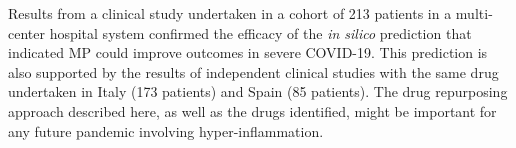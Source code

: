 
Results from a clinical study undertaken in a cohort of 213 patients in a multi-center hospital system confirmed the efficacy of the \emph{in silico} prediction that indicated MP could improve outcomes in severe COVID-19. 
This prediction is also supported by the results of independent clinical studies with the same drug undertaken in Italy (173 patients) and Spain (85 patients). The drug repurposing approach described here, as well as the drugs identified, might be important for any future pandemic involving hyper-inflammation.
